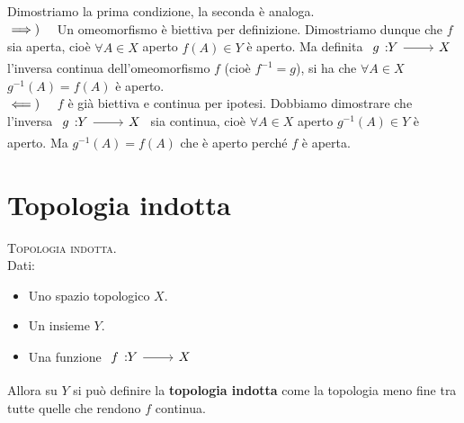 \begin{demonstration}
Dimostriamo la prima condizione, la seconda è analoga.\\
$\implies)\quad$ Un omeomorfismo è biettiva per definizione. Dimostriamo dunque che $f$ sia aperta, cioè $\forall A\in X$ aperto $f\left(A\right)\in Y$ è aperto. Ma definita $\funz{g}{Y}{X}$ l'inversa continua dell'omeomorfismo $f$ (cioè $f^{-1}=g$), si ha che $\forall A\in X$ $g^{-1}\left(A\right)=f\left(A\right)$ è aperto.\\
$\impliedby)\quad$ $f$ è già biettiva e continua per ipotesi. Dobbiamo dimostrare che l'inversa $\funz{g}{Y}{X}$ sia continua, cioè $\forall A\in X$ aperto $g^{-1}\left(A\right)\in Y$ è aperto. Ma $g^{-1}\left(A\right)=f\left(A\right)$ che è aperto perché $f$ è aperta.
\end{demonstration}
\section{Topologia indotta}
\begin{define}\textsc{Topologia indotta.}\\
Dati:
\begin{itemize}
\item Uno spazio topologico $X$.
\item Un insieme $Y$.
\item Una funzione $\funz{f}{Y}{X}$
\end{itemize}
Allora su $Y$ si può definire la \textbf{topologia indotta} come la topologia meno fine tra tutte quelle che rendono $f$ continua.
\end{define}
